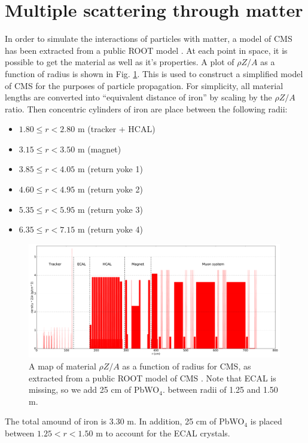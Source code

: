 \documentclass[12pt]{article}
\begin{document}
\section{Multiple scattering through matter}
In order to simulate the interactions of particles with matter, a model of CMS has been extracted from a public ROOT model \cite{ROOT_cms}.
At each point in space, it is possible to get the material as well as it's properties. A plot of $\rho Z/A$ as a function of radius is
shown in Fig. \ref{fig:cmsdensity}. This is used to construct a simplified model of CMS for the purposes of particle propagation.
For simplicity, all material lengths are converted into ``equivalent distance of iron'' by scaling by the $\rho Z/A$ ratio. Then concentric
cylinders of iron are place between the following radii:
\begin{itemize}
\item $1.80 \leq r < 2.80$ m (tracker + HCAL)
\item $3.15 \leq r < 3.50$ m (magnet)
\item $3.85 \leq r < 4.05$ m (return yoke 1)
\item $4.60 \leq r < 4.95$ m (return yoke 2)
\item $5.35 \leq r < 5.95$ m (return yoke 3)
\item $6.35 \leq r < 7.15$ m (return yoke 4)
\end{itemize}

\begin{figure}
\centering
\includegraphics[width=0.99\textwidth]{plots/cms_density_map.pdf}
\caption{A map of material $\rho Z/A$ as a function of radius for CMS, as extracted from a public ROOT model of CMS \cite{ROOT_cms}.
Note that ECAL is missing, so we add 25 cm of PbWO$_4$. between radii of 1.25 and 1.50 m.}
\label{fig:cmsdensity}
\end{figure}

The total amound of iron is 3.30 m. In addition, 25 cm of PbWO$_4$ is placed between $1.25 < r < 1.50$ m to account for the ECAL crystals.
\end{document}
